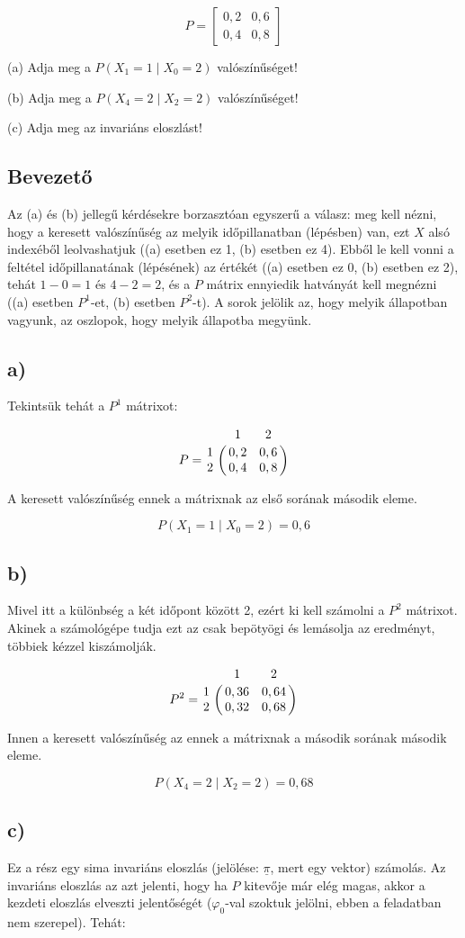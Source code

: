 \documentclass[a4paper,12pt]{article}
\begin{document}
\[
P = 
\begin{bmatrix} 
0,2    &    0,6 \\
0,4    &    0,8
\end{bmatrix}
\]

(a) Adja meg a $P(X_1 = 1 \mid X_0 = 2)$ valószínűséget!

(b) Adja meg a $P(X_4 = 2 \mid X_2 = 2)$ valószínűséget!

(c) Adja meg az invariáns eloszlást!

\subsection*{Bevezető}
Az (a) és (b) jellegű kérdésekre borzasztóan egyszerű a válasz:
meg kell nézni, hogy a keresett valószínűség az  melyik időpillanatban 
(lépésben) van, ezt $X$ alsó indexéből leolvashatjuk ((a) esetben ez 1,
(b) esetben ez 4). 
Ebből le kell vonni a feltétel időpillanatának (lépésének) az értékét 
((a) esetben ez 0, (b) esetben ez 2), tehát $1-0=1$ és $4-2=2$, és a 
$P$ mátrix ennyiedik hatványát kell megnézni
((a) esetben $P^1$-et, (b) esetben $P^2$-t). A sorok jelölik az, hogy 
melyik állapotban vagyunk, az oszlopok, hogy melyik állapotba megyünk.

\subsection*{a)}
Tekintsük tehát a $P^1$ mátrixot:

\[
P = 
\bordermatrix{
~	&	1	&	2	\cr
1	&	0,2	&	0,6	\cr
2	&	0,4	&	0,8}
\]

A keresett valószínűség ennek a mátrixnak az első sorának második eleme.

\[
P(X_1 = 1 \mid X_0 = 2) = 0,6
\]

\subsection*{b)}
Mivel itt a különbség a két időpont között 2, ezért ki kell számolni a 
$P^2$ mátrixot. Akinek a számológépe tudja ezt az csak bepötyögi és 
lemásolja az eredményt,  többiek kézzel kiszámolják.

\[
P^2 = 
\bordermatrix{
~	&	1	    &	2    	\cr
1	&	0,36	&	0,64	\cr
2	&	0,32	&	0,68}
\]

Innen a keresett valószínűség az ennek a mátrixnak a második sorának
második eleme.

\[
P(X_4 = 2 \mid X_2 = 2) = 0,68
\]

\subsection*{c)}
Ez a rész egy sima invariáns eloszlás (jelölése: $\underline{\pi}$, 
mert egy vektor) számolás. Az invariáns eloszlás 
az azt jelenti, hogy ha $P$ kitevője már elég magas, akkor a kezdeti
eloszlás elveszti jelentőségét ($\varphi_0$-val szoktuk jelölni, ebben a
feladatban nem szerepel). Tehát:
\end{document}

